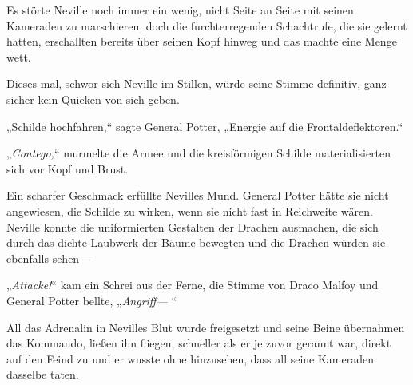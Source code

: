 Es störte Neville noch immer ein wenig, nicht Seite an Seite mit seinen Kameraden zu marschieren, doch die furchterregenden Schachtrufe, die sie gelernt hatten, erschallten bereits über seinen Kopf hinweg und das machte eine Menge wett.

Dieses mal, schwor sich Neville im Stillen, würde seine Stimme definitiv, ganz sicher kein Quieken von sich geben.

„Schilde hochfahren,“ sagte General Potter, „Energie auf die Frontaldeflektoren.“

„\emph{Contego,}“ murmelte die Armee und die kreisförmigen Schilde materialisierten sich vor Kopf und Brust.

Ein scharfer Geschmack erfüllte Nevilles Mund. General Potter hätte sie nicht angewiesen, die Schilde zu wirken, wenn sie nicht fast in Reichweite wären. Neville konnte die uniformierten Gestalten der Drachen ausmachen, die sich durch das dichte Laubwerk der Bäume bewegten und die Drachen würden sie ebenfalls sehen—

„\emph{Attacke!}“ kam ein Schrei aus der Ferne, die Stimme von Draco Malfoy und General Potter bellte, „\emph{Angriff—} “

All das Adrenalin in Nevilles Blut wurde freigesetzt und seine Beine übernahmen das Kommando, ließen ihn fliegen, schneller als er je zuvor gerannt war, direkt auf den Feind zu und er wusste ohne hinzusehen, dass all seine Kameraden dasselbe taten.

